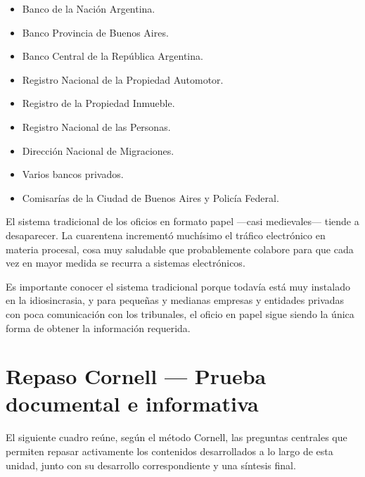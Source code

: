 \documentclass[12pt,oneside]{book}
\begin{document}
\begin{itemize}
    \item Banco de la Nación Argentina.
    \item Banco Provincia de Buenos Aires.
    \item Banco Central de la República Argentina.
    \item Registro Nacional de la Propiedad Automotor.
    \item Registro de la Propiedad Inmueble.
    \item Registro Nacional de las Personas.
    \item Dirección Nacional de Migraciones.
    \item Varios bancos privados.
    \item Comisarías de la Ciudad de Buenos Aires y Policía Federal.
\end{itemize}

\begin{note}
El sistema tradicional de los oficios en formato papel —casi medievales— tiende a desaparecer. La cuarentena incrementó muchísimo el tráfico electrónico en materia procesal, cosa muy saludable que probablemente colabore para que cada vez en mayor medida se recurra a sistemas electrónicos.
\end{note}

Es importante conocer el sistema tradicional porque todavía está muy instalado en la idiosincrasia, y para pequeñas y medianas empresas y entidades privadas con poca comunicación con los tribunales, el oficio en papel sigue siendo la única forma de obtener la información requerida.

\chapter{Repaso Cornell — Prueba documental e informativa}

El siguiente cuadro reúne, según el método Cornell, las preguntas centrales que permiten repasar activamente los contenidos desarrollados a lo largo de esta unidad, junto con su desarrollo correspondiente y una síntesis final.
\end{document}
